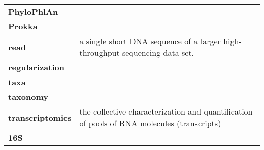 \begin{singlespace}
\begin{longtable}{ p{}  p{} }
\textbf{PhyloPhlAn} &  \\
\textbf{Prokka} &  \\
\textbf{read} & a single short DNA sequence of a larger high-throughput sequencing data set. \\
\textbf{regularization} &  \\
\textbf{taxa} &  \\
\textbf{taxonomy} &  \\
\textbf{transcriptomics} & the collective characterization and quantification of pools of RNA molecules (transcripts) \\
\textbf{16S} &  \\

\end{longtable}
\end{singlespace}
